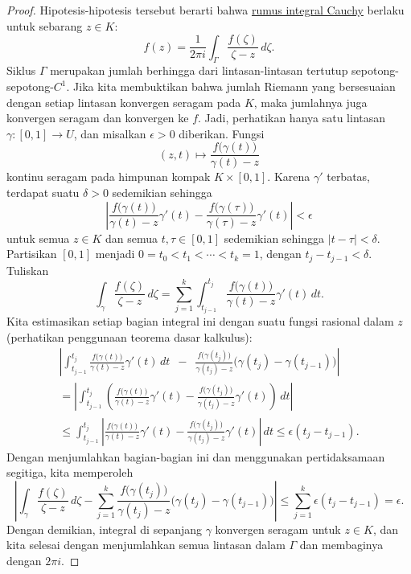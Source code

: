 \documentclass[12pt,openany]{book}
\newcommand{\sabs}[1]{\lvert {#1} \rvert}
\newcommand{\abs}[1]{\left\lvert {#1} \right\rvert}
\theoremstyle{plain}
\theoremstyle{remark}
\theoremstyle{definition}
\theoremstyle{exercise}
\theoremstyle{example}
\begin{document}
\begin{proof}
Hipotesis-hipotesis tersebut berarti bahwa \hyperref[thm:CIFhomology]{rumus integral Cauchy}
berlaku untuk sebarang $z \in K$:
\begin{equation*}
f(z) =
\frac{1}{2\pi i}
\int_\Gamma
\frac{f(\zeta)}{\zeta-z} \, d \zeta .
\end{equation*}
Siklus $\Gamma$ merupakan jumlah berhingga dari lintasan-lintasan tertutup sepotong-sepotong-$C^1$.
Jika kita membuktikan bahwa jumlah Riemann yang bersesuaian dengan setiap lintasan
konvergen seragam pada $K$, maka jumlahnya juga konvergen seragam
dan konvergen ke $f$.
Jadi, perhatikan hanya satu lintasan $\gamma \colon [0,1] \to U$, dan
misalkan $\epsilon > 0$ diberikan.
Fungsi
\begin{equation*}
(z,t) \mapsto
\frac{f\bigl(\gamma(t)\bigr)}{\gamma(t)-z}
\end{equation*}
kontinu seragam pada himpunan kompak $K \times [0,1]$.
Karena $\gamma'$ terbatas, terdapat suatu $\delta > 0$ sedemikian sehingga
\begin{equation*}
\abs{
\frac{f\bigl(\gamma(t)\bigr)}{\gamma(t)-z}\gamma'(t)
-
\frac{f\bigl(\gamma(\tau)\bigr)}{\gamma(\tau)-z}\gamma'(t)
} < \epsilon
\end{equation*}
untuk semua $z \in K$ dan semua $t,\tau \in [0,1]$ sedemikian sehingga $\sabs{t-\tau} <
\delta$.
Partisikan $[0,1]$ menjadi $0 = t_0 < t_1 < \cdots < t_k = 1$, dengan
$t_j-t_{j-1} < \delta$.
Tuliskan
\begin{equation*}
\int_\gamma
\frac{f(\zeta)}{\zeta-z} \, d\zeta
=
\sum_{j=1}^k
\int_{t_{j-1}}^{t_j}
\frac{f\bigl(\gamma(t)\bigr)}{\gamma(t)-z}
\gamma'(t)
\, dt .
\end{equation*}
Kita estimasikan setiap bagian integral ini dengan suatu fungsi rasional
dalam $z$
(perhatikan penggunaan teorema dasar kalkulus):
\begin{multline*}
\abs{
\int_{t_{j-1}}^{t_j}
\frac{f\bigl(\gamma(t)\bigr)}{\gamma(t)-z}
\gamma'(t)
\, dt
\enspace
-
\enspace
\frac{f\bigl(\gamma(t_j)\bigr)}{\gamma(t_j)-z}
\bigl( \gamma(t_j)-\gamma(t_{j-1}) \bigr)
}
\\
=
\abs{
\int_{t_{j-1}}^{t_j}
\left(
\frac{f\bigl(\gamma(t)\bigr)}{\gamma(t)-z}
\gamma'(t)
-
\frac{f\bigl(\gamma(t_j)\bigr)}{\gamma(t_j)-z}
\gamma'(t)
\right)
\, dt
}
\\
\leq
\int_{t_{j-1}}^{t_j}
\abs{
\frac{f\bigl(\gamma(t)\bigr)}{\gamma(t)-z}
\gamma'(t)
-
\frac{f\bigl(\gamma(t_j)\bigr)}{\gamma(t_j)-z}
\gamma'(t)
}
\, dt
\leq \epsilon (t_j-t_{j-1}) .
\end{multline*}
Dengan menjumlahkan bagian-bagian ini dan menggunakan pertidaksamaan segitiga, kita memperoleh
\begin{equation*}
\abs{
\int_{\gamma} \frac{f(\zeta)}{\zeta-z} \, d\zeta
-
\sum_{j=1}^k
\frac{f\bigl(\gamma(t_j)\bigr)}{\gamma(t_j)-z}
\bigl( \gamma(t_j)-\gamma(t_{j-1}) \bigr)
}
\leq \sum_{j=1}^k \epsilon (t_j-t_{j-1}) = \epsilon .
\end{equation*}
Dengan demikian, integral di sepanjang $\gamma$ konvergen seragam untuk $z \in K$, dan
kita selesai dengan menjumlahkan semua lintasan dalam $\Gamma$
dan membaginya dengan $2\pi i$.
\end{proof}
\end{document}
